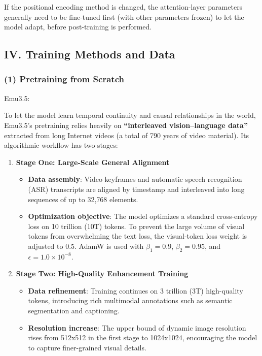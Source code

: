 If the positional encoding method is changed, the attention-layer parameters generally need to be fine-tuned first (with other parameters frozen) to let the model adapt, before post-training is performed.

\hypertarget{iv.-training-methods-and-data}{%
\subsection{IV. Training Methods and Data}\label{iv.-training-methods-and-data}}

\hypertarget{pretraining-from-scratch}{%
\subsubsection{(1) Pretraining from Scratch}\label{pretraining-from-scratch}}

Emu3.5:

To let the model learn temporal continuity and causal relationships in the world, Emu3.5's pretraining relies heavily on \textbf{``interleaved vision--language data''} extracted from long Internet videos (a total of 790 years of video material). Its algorithmic workflow has two stages:

\begin{enumerate}
\def\labelenumi{\arabic{enumi}.}
\tightlist
\item
  \textbf{Stage One: Large-Scale General Alignment}

  \begin{itemize}
  \tightlist
  \item
    \textbf{Data assembly}: Video keyframes and automatic speech recognition (ASR) transcripts are aligned by timestamp and interleaved into long sequences of up to 32,768 elements.
  \item
    \textbf{Optimization objective}: The model optimizes a standard cross-entropy loss on 10 trillion (10T) tokens. To prevent the large volume of visual tokens from overwhelming the text loss, the visual-token loss weight is adjusted to 0.5. AdamW is used with \(\beta_1=0.9\), \(\beta_2=0.95\), and \(\epsilon=1.0\times10^{-8}\).
  \end{itemize}
\item
  \textbf{Stage Two: High-Quality Enhancement Training}

  \begin{itemize}
  \tightlist
  \item
    \textbf{Data refinement}: Training continues on 3 trillion (3T) high-quality tokens, introducing rich multimodal annotations such as semantic segmentation and captioning.
  \item
    \textbf{Resolution increase}: The upper bound of dynamic image resolution rises from 512x512 in the first stage to 1024x1024, encouraging the model to capture finer-grained visual details.
  \end{itemize}
\end{enumerate}

